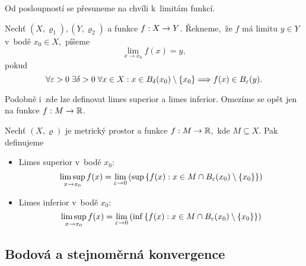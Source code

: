 Od posloupností se přesuneme na chvíli k~limitám funkcí.
\begin{definition}\label{def:limita-fce-v-bode}
    Nechť $(X,\varrho_1),(Y,\varrho_2)$ a funkce $f:X \rightarrow Y$. Řekneme,~že $f$ má limitu $y\in Y$ v~bodě $x_0\in X$,~píšeme
    \[\lim_{x\to x_0}f(x)=y,\]
    pokud
    \[\forall \varepsilon >0\;\exists \delta >0\;\forall x\in X: x\in B_\delta(x_0)\setminus\left\{x_0\right\}\Longrightarrow f(x)\in B_\varepsilon(y).\]
\end{definition}
Podobně i~zde lze definovat limes superior a limes inferior. Omezíme se opět jen na funkce $f:M \rightarrow \mathbb{R}$.
\begin{definition}\label{def:limsup-liminf-funkce}
    Nechť $(X,\varrho)$ je metrický prostor a funkce $f:M \rightarrow \mathbb{R}$,~kde $M\subseteq X$. Pak definujeme
    \begin{itemize}
        \item Limes superior v~bodě $x_0$:
        \[\limsup _{x\to x_0}f(x)=\lim _{\varepsilon \to 0}\left(\sup\left\{f(x):x\in M\cap B_\varepsilon(x_0)\setminus \{x_0\}\right\}\right)\]
        \item Limes inferior v~bodě $x_0$:
        \[\limsup _{x\to x_0}f(x)=\lim _{\varepsilon \to 0}\left(\inf\left\{f(x):x\in M\cap B_\varepsilon(x_0)\setminus \{x_0\}\right\}\right)\]
    \end{itemize}
\end{definition}

\subsection{Bodová a stejnoměrná konvergence}\label{subsec:bodova-stejnomerna-konvergence}

